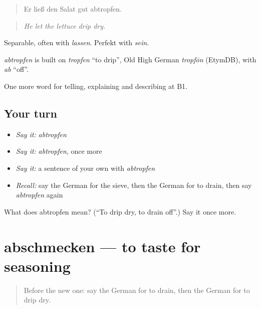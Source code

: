 \begin{quote}
Er ließ den Salat gut abtropfen.
\end{quote}

\begin{quote}
\emph{He let the lettuce drip dry.}
\end{quote}

Separable, often with \emph{lassen}. Perfekt with \emph{sein}.

\begin{cousinweb}
\emph{abtropfen} is built on \emph{tropfen} \textquotedblleft{}to drip\textquotedblright{}, Old High German \emph{tropfōn} (EtymDB), with \emph{ab} \textquotedblleft{}off\textquotedblright{}.
\end{cousinweb}

\begin{grammarlens}[title={What you've built}]
One more word for telling, explaining and describing at B1.
\end{grammarlens}

\subsection*{Your turn}
\begin{itemize}
\raggedright
  \item \emph{Say it:} \emph{abtropfen}
  \item \emph{Say it:} \emph{abtropfen}, once more
  \item \emph{Say it:} a sentence of your own with \emph{abtropfen}
  \item \emph{Recall:} say the German for the sieve, then the German for to drain, then say \emph{abtropfen} again
\end{itemize}

\begin{tcolorbox}[breakable,colback=teal!4,colframe=teal!35!black,title={Before you move on}]
What does abtropfen mean? (\textquotedblleft{}To drip dry, to drain off\textquotedblright{}.) Say it once more.
\end{tcolorbox}
\section[abschmecken]{abschmecken — to taste for seasoning}

\label{lesson:GE-C328-abschmecken}



\begin{quote}
Before the new one: say the German for to drain, then the German for to drip dry.
\end{quote}

